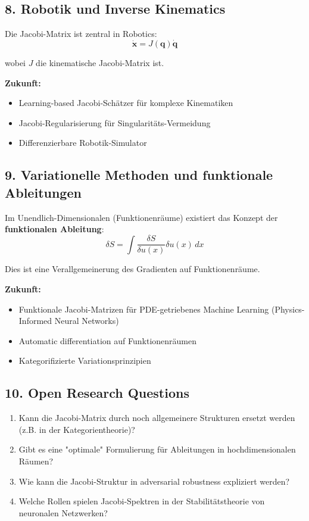 ﻿\documentclass[a4paper,12pt]{article}
\theoremstyle{definition}
\begin{document}
\subsection{8. Robotik und Inverse Kinematics}

Die Jacobi-Matrix ist zentral in Robotics:
\[
\dot{\boldsymbol{x}} = J(\boldsymbol{q}) \dot{\boldsymbol{q}}
\]

wobei $J$ die kinematische Jacobi-Matrix ist.

\textbf{Zukunft:}
\begin{itemize}
	\item Learning-based Jacobi-Schätzer für komplexe Kinematiken
	\item Jacobi-Regularisierung für Singularitäts-Vermeidung
	\item Differenzierbare Robotik-Simulator
\end{itemize}

\subsection{9. Variationelle Methoden und funktionale Ableitungen}

Im Unendlich-Dimensionalen (Funktionenräume) existiert das Konzept der \textbf{funktionalen Ableitung}:
\[
\delta S = \int \frac{\delta S}{\delta u(x)} \delta u(x) \, dx
\]

Dies ist eine Verallgemeinerung des Gradienten auf Funktionenräume.

\textbf{Zukunft:}
\begin{itemize}
	\item Funktionale Jacobi-Matrizen für PDE-getriebenes Machine Learning (Physics-Informed Neural Networks)
	\item Automatic differentiation auf Funktionenräumen
	\item Kategorifizierte Variationsprinzipien
\end{itemize}

\subsection{10. Open Research Questions}

\begin{enumerate}
	\item Kann die Jacobi-Matrix durch noch allgemeinere Strukturen ersetzt werden (z.B. in der Kategorientheorie)?
	\item Gibt es eine "optimale" Formulierung für Ableitungen in hochdimensionalen Räumen?
	\item Wie kann die Jacobi-Struktur in adversarial robustness expliziert werden?
	\item Welche Rollen spielen Jacobi-Spektren in der Stabilitätstheorie von neuronalen Netzwerken?
\end{enumerate}
\end{document}
